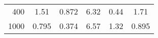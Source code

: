 \begin{table}
\begin{tabular}{r c c c c c}
        400 & 1.51   & 0.872  & 6.32   & 0.44   & 1.71   \\
        1000 & 0.795 & 0.374  & 6.57   & 1.32   & 0.895  \\
        \bottomrule
    \end{tabular}
\end{table}

